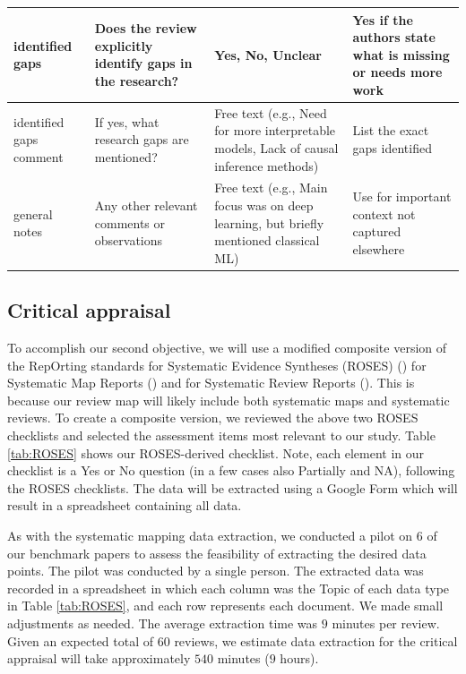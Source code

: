 \documentclass{article}
\begin{document}
\begin{longtable}{p{1.5cm}|p{3cm}|p{3cm}|p{3cm}}
        \hline
        identified gaps & Does the review explicitly identify gaps in the research? & Yes, No, Unclear & Yes if the authors state what is missing or needs more work\\
        \hline
        identified gaps comment & If yes, what research gaps are mentioned? & Free text (e.g., Need for more interpretable models, Lack of causal inference methods) & List the exact gaps identified \\
        \hline
        general notes & Any other relevant comments or observations & Free text (e.g., Main focus was on deep learning, but briefly mentioned classical ML) & Use for important context not captured elsewhere
    \label{tab:systMap}
    \end{longtable}

\subsection{Critical appraisal}

To accomplish our second objective, we will use a modified composite version of the RepOrting standards for Systematic Evidence Syntheses (ROSES) (\citep{haddaway2018roses}) for Systematic Map Reports (\citep{haddaway2017rosesMap}) and for Systematic Review Reports (\cite{haddaway2017rosesReview}). This is because our review map will likely include both systematic maps and systematic reviews. To create a composite version, we reviewed the above two ROSES checklists and selected the assessment items most relevant to our study. Table \ref{tab:ROSES} shows our ROSES-derived checklist. Note, each element in our checklist is a Yes or No question (in a few cases also Partially and NA), following the ROSES checklists. The data will be extracted using a Google Form which will result in a spreadsheet containing all data.

As with the systematic mapping data extraction, we conducted a pilot on $6$ of our benchmark papers to assess the feasibility of extracting the desired data points. The pilot was conducted by a single person. The extracted data was recorded in a spreadsheet in which each column was the Topic of each data type in Table \ref{tab:ROSES}, and each row represents each document. We made small adjustments as needed. The average extraction time was $9$ minutes per review. Given an expected total of $60$ reviews, we estimate data extraction for the critical appraisal will take approximately $540$ minutes ($9$ hours).
\end{document}
